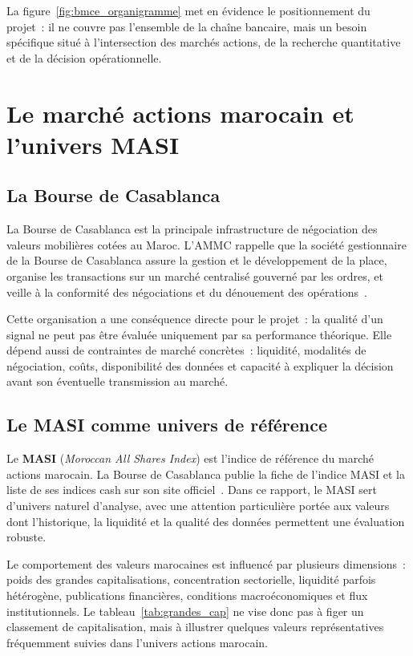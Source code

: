 La figure~\ref{fig:bmce_organigramme} met en évidence le positionnement du projet~:
il ne couvre pas l'ensemble de la chaîne bancaire, mais un besoin spécifique situé à
l'intersection des marchés actions, de la recherche quantitative et de la décision
opérationnelle.

\section{Le marché actions marocain et l'univers MASI}
\label{sec:masi}

\subsection{La Bourse de Casablanca}

La Bourse de Casablanca est la principale infrastructure de négociation des valeurs
mobilières cotées au Maroc. L'AMMC rappelle que la société gestionnaire de la Bourse
de Casablanca assure la gestion et le développement de la place, organise les
transactions sur un marché centralisé gouverné par les ordres, et veille à la conformité
des négociations et du dénouement des opérations~\cite{ammc_bourse_casablanca}.

Cette organisation a une conséquence directe pour le projet~: la qualité d'un signal
ne peut pas être évaluée uniquement par sa performance théorique. Elle dépend aussi de
contraintes de marché concrètes~: liquidité, modalités de négociation, coûts,
disponibilité des données et capacité à expliquer la décision avant son éventuelle
transmission au marché.

\subsection{Le MASI comme univers de référence}

Le \textbf{MASI} (\textit{Moroccan All Shares Index}) est l'indice de référence du
marché actions marocain. La Bourse de Casablanca publie la fiche de l'indice MASI et
la liste de ses indices cash sur son site officiel~\cite{bourse_casablanca_masi,bourse_casablanca_indices}.
Dans ce rapport, le MASI sert d'univers naturel d'analyse, avec une attention particulière
portée aux valeurs dont l'historique, la liquidité et la qualité des données permettent
une évaluation robuste.

Le comportement des valeurs marocaines est influencé par plusieurs dimensions~: poids
des grandes capitalisations, concentration sectorielle, liquidité parfois hétérogène,
publications financières, conditions macroéconomiques et flux institutionnels. Le
tableau~\ref{tab:grandes_cap} ne vise donc pas à figer un classement de capitalisation,
mais à illustrer quelques valeurs représentatives fréquemment suivies dans l'univers
actions marocain.


